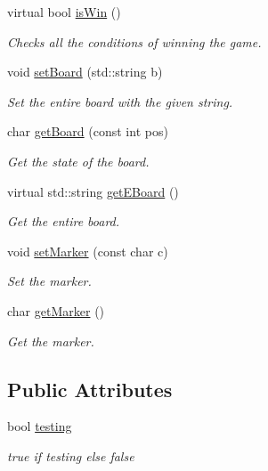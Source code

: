 \begin{DoxyCompactItemize}
virtual bool \mbox{\hyperlink{classBoard_ae59ed3d0322d92f9d9ae3ee6652e7268}{is\+Win}} ()
\begin{DoxyCompactList}\small\item\em Checks all the conditions of winning the game. \end{DoxyCompactList}\item 
void \mbox{\hyperlink{classBoard_a47d1cea73ebf03e59b09d1134348c377}{set\+Board}} (std\+::string b)
\begin{DoxyCompactList}\small\item\em Set the entire board with the given string. \end{DoxyCompactList}\item 
char \mbox{\hyperlink{classBoard_af7e9c87bb428473eb051ca19ee36ca95}{get\+Board}} (const int pos)
\begin{DoxyCompactList}\small\item\em Get the state of the board. \end{DoxyCompactList}\item 
virtual std\+::string \mbox{\hyperlink{classBoard_a3707ab499357d887c1be4e2bbb477891}{get\+E\+Board}} ()
\begin{DoxyCompactList}\small\item\em Get the entire board. \end{DoxyCompactList}\item 
void \mbox{\hyperlink{classBoard_add8b23c5ba550963a8e1641b6df26fa9}{set\+Marker}} (const char c)
\begin{DoxyCompactList}\small\item\em Set the marker. \end{DoxyCompactList}\item 
char \mbox{\hyperlink{classBoard_a735a4eec8098cf419441ebb7e4b4fa16}{get\+Marker}} ()
\begin{DoxyCompactList}\small\item\em Get the marker. \end{DoxyCompactList}\end{DoxyCompactItemize}
\subsection*{Public Attributes}
\begin{DoxyCompactItemize}
\item 
\mbox{\label{classBoard_a4316921df2e4940189b17c351e1305f8}} 
bool \mbox{\hyperlink{classBoard_a4316921df2e4940189b17c351e1305f8}{testing}}
\begin{DoxyCompactList}\small\item\em true if testing else false \end{DoxyCompactList}\end{DoxyCompactItemize}


